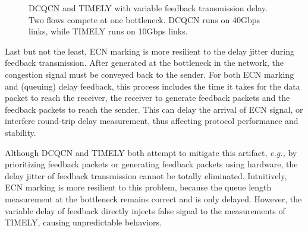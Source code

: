 \begin{figure}
\center
{}
\vspace{-1em}
\caption{DCQCN and TIMELY with variable feedback transmission delay. Two flows compete at 
one bottleneck. DCQCN runs on 40Gbps links, while TIMELY runs on 10Gbps links.}
\vspace{-1em}
\label{fig:variable_delay}
\end{figure}

Last but not the least, ECN marking is more resilient to the delay jitter during feedback 
transmission. After generated at the bottleneck in the network, the congestion signal must
be conveyed back to the sender. For both ECN marking and (queuing) delay feedback, this 
process includes the time it takes for the data packet to reach the receiver, the receiver
to generate feedback packets and the feedback packets to reach the sender. This can delay
the arrival of ECN signal, or interfere round-trip delay measurement, thus affecting
protocol performance and stability.

Although DCQCN and TIMELY both attempt to mitigate this artifact, {\em e.g.,} by prioritizing
feedback packets or generating feedback packets using hardware, the delay jitter of
feedback transmission cannot be totally eliminated. Intuitively, ECN marking is more
resilient to this problem, because the queue length measurement at the bottleneck remains
correct and is only delayed. However, the variable delay of feedback directly injects false signal
to the measurements of TIMELY, causing unpredictable behaviors.

